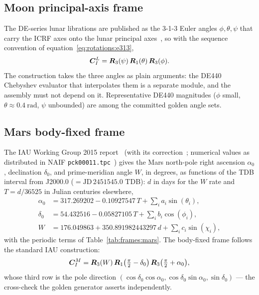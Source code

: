 \subsection{Moon principal-axis frame}

The DE-series lunar librations are published as the 3-1-3 Euler angles
$\phi, \theta, \psi$ that carry the ICRF axes onto the lunar
principal axes~\cite{park2021}, so with the sequence convention of
equation~\eqref{eq:rotations:e313},
\begin{equation}
  \bm{C}_{I}^{L} = \bm{R}_3(\psi)\, \bm{R}_1(\theta)\, \bm{R}_3(\phi).
  \label{eq:frames:moonpa}
\end{equation}
The construction takes the three angles as plain arguments: the DE440
Chebyshev evaluator that interpolates them is a separate module, and the
assembly must not depend on it. Representative DE440 magnitudes ($\phi$
small, $\theta \approx \qty{0.4}{\radian}$, $\psi$ unbounded) are among
the committed golden angle sets.

\subsection{Mars body-fixed frame}

The IAU Working Group 2015 report~\cite{archinal2018} (with its
correction~\cite{archinal2019}; numerical values as distributed in NAIF
\texttt{pck00011.tpc}~\cite{pck00011}) gives the Mars north-pole right
ascension $\alpha_0$, declination $\delta_0$, and prime-meridian angle
$W$, in degrees, as functions of the TDB interval from J2000.0
($= \mathrm{JD}\,2451545.0$ TDB): $d$ in days for the $W$ rate and $T =
d/36525$ in Julian centuries elsewhere,
\begin{equation}
  \begin{aligned}
    \alpha_0 &= 317.269202 - 0.10927547\,T
      + \textstyle\sum_i a_i \sin(\theta_i), \\
    \delta_0 &= 54.432516 - 0.05827105\,T
      + \textstyle\sum_i b_i \cos(\phi_i), \\
    W &= 176.049863 + 350.891982443297\,d
      + \textstyle\sum_i c_i \sin(\chi_i),
  \end{aligned}
  \label{eq:frames:mars}
\end{equation}
with the periodic terms of Table~\ref{tab:frames:mars}. The body-fixed
frame follows the standard IAU construction:
\begin{equation}
  \bm{C}_{I}^{M} = \bm{R}_3(W)\,
    \bm{R}_1\bigl(\tfrac{\pi}{2} - \delta_0\bigr)\,
    \bm{R}_3\bigl(\tfrac{\pi}{2} + \alpha_0\bigr),
  \label{eq:frames:marsdcm}
\end{equation}
whose third row is the pole direction $(\cos\delta_0 \cos\alpha_0,
\cos\delta_0 \sin\alpha_0, \sin\delta_0)$ --- the cross-check the golden
generator asserts independently.

